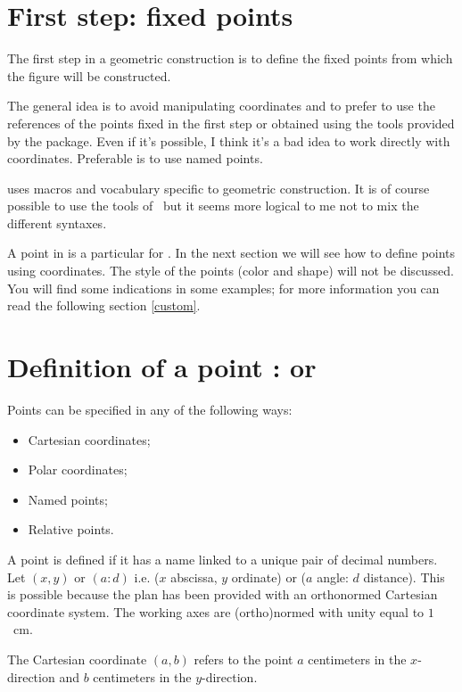 \section{First step: fixed points}

The first step in a geometric construction is to define the fixed points from which the figure will be constructed.

The general idea is to avoid manipulating coordinates and to prefer to use the references of the points fixed in the first step or obtained using the tools provided by the package. Even if it's possible, I think it's a bad idea to work directly with coordinates. Preferable is to use named points.

\tkzname{\tkznameofpack} uses macros and vocabulary specific to geometric construction. It is of course possible to use the tools of \TIKZ\ but it seems more logical to me not to mix the different syntaxes.

A point in \tkzname{\tkznameofpack} is a particular  for \TIKZ. In the next section we will see how to define points using coordinates. The style of the points (color and shape) will not be discussed. You will find some indications in some examples; for more information you can read the following section \ref{custom}.


\section{Definition of a point :  or }

 Points can be specified in any of the following ways:
\begin{itemize}
\item Cartesian coordinates;
\item Polar coordinates;
\item Named points;
\item Relative points.
\end{itemize}


A point is defined if it has a name linked to a unique pair of decimal numbers. 
 Let $(x,y)$ or $(a:d)$  i.e. ($x$ abscissa, $y$ ordinate) or  ($a$ angle: $d$ distance).
 This is possible because the plan has been provided with an orthonormed Cartesian coordinate system.   The working axes are  (ortho)normed with unity equal to $1$~cm.
 
 The Cartesian coordinate $(a,b)$ refers to the
 point $a$ centimeters in the $x$-direction and $b$ centimeters in the
 $y$-direction.

